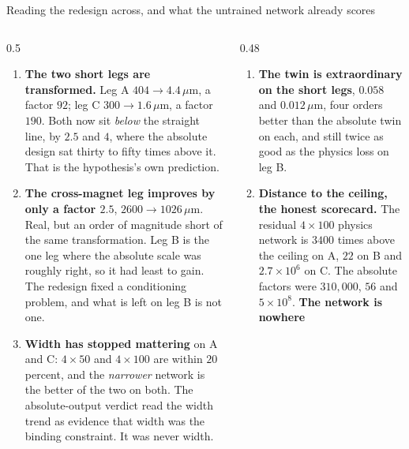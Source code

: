 \documentclass[aspectratio=169,10pt]{beamer}
\newcommand{\um}{\ensuremath{\,\mu\mathrm{m}}}
\newcommand{\hl}[1]{{\color{accent}\textbf{#1}}}
\newcommand{\bad}[1]{{\color{warm}\textbf{#1}}}
\begin{document}
\begin{frame}[shrink=25]{Reading the redesign across, and what the untrained network already scores}
  \vspace{1mm}
  \begin{columns}[T]
    \begin{column}{0.5\textwidth}
      \begin{enumerate}\small
        \item \hl{The two short legs are transformed.} Leg A $404 \to 4.4\um$, a
              factor $92$; leg C $300 \to 1.6\um$, a factor $190$. Both now sit
              \emph{below} the straight line, by $2.5$ and $4$, where the
              absolute design sat thirty to fifty times above it. That is the
              hypothesis's own prediction.
        \item \bad{The cross-magnet leg improves by only a factor $2.5$}, $2600
              \to 1026\um$. Real, but an order of magnitude short of the same
              transformation. Leg B is the one leg where the absolute scale was
              roughly right, so it had least to gain. The redesign fixed a
              conditioning problem, and what is left on leg B is not one.
        \item \hl{Width has stopped mattering} on A and C: $4\times50$ and
              $4\times100$ are within $20$ percent, and the \emph{narrower}
              network is the better of the two on both. The absolute-output
              verdict read the width trend as evidence that width was the
              binding constraint. It was never width.
      \end{enumerate}
    \end{column}
    \begin{column}{0.48\textwidth}
      \begin{enumerate}\small
        \setcounter{enumi}{3}
        \item \hl{The twin is extraordinary on the short legs}, $0.058$ and
              $0.012\um$, four orders better than the absolute twin on each, and
              still twice as good as the physics loss on leg B.
        \item \hl{Distance to the ceiling, the honest scorecard.} The residual
              $4\times100$ physics network is $3400$ times above the ceiling on
              A, $22$ on B and $2.7\times10^{6}$ on C. The absolute factors were
              $310{,}000$, $56$ and $5\times10^{8}$. \bad{The network is nowhere
}
\end{enumerate}
\end{column}
\end{columns}
\end{frame}
\end{document}

